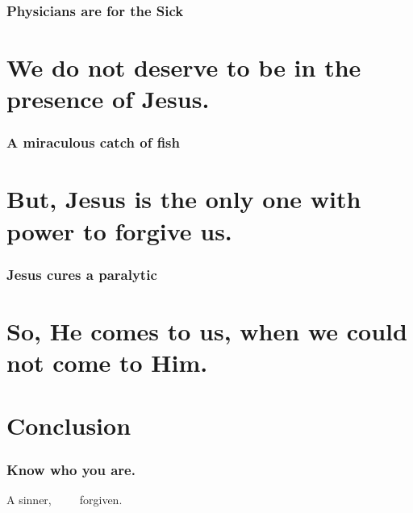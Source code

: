 \documentclass{beamer}
\begin{document}
\begin{frame}
\frametitle{Physicians are for the Sick}
\tableofcontents[sectionstyle=show/show]
\end{frame}

\section{We do not deserve to be in the presence of Jesus.}
\begin{frame}
\frametitle{A miraculous catch of fish}
\end{frame}

\begin{frame}
\frametitle{}
\end{frame}

\section{But, Jesus is the only one with power to forgive us.}
\begin{frame}
\frametitle{Jesus cures a paralytic}
\end{frame}

\section{So, He comes to us, when we could not come to Him.}
\begin{frame}
\frametitle{}
\end{frame}

\section*{Conclusion}
\begin{frame}
\frametitle{Know who you are.}
A sinner,~~~~~forgiven.
\end{frame}
\end{document}
